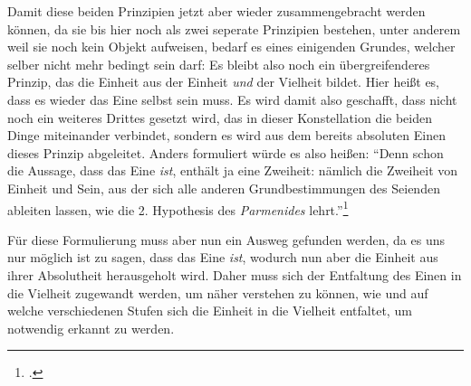 Damit diese beiden Prinzipien jetzt aber wieder zusammengebracht werden können, da sie bis hier noch als zwei seperate Prinzipien bestehen, unter anderem weil sie noch kein Objekt aufweisen, bedarf es eines einigenden Grundes, welcher selber nicht mehr bedingt sein darf:
Es bleibt also noch ein übergreifenderes Prinzip, das die Einheit aus der Einheit \emph{und} der Vielheit bildet. Hier heißt es, dass es wieder das Eine selbst sein muss. Es wird damit also geschafft, dass nicht noch ein weiteres Drittes gesetzt wird, das in dieser Konstellation die beiden Dinge miteinander verbindet, sondern es wird aus dem bereits absoluten Einen dieses Prinzip abgeleitet. 
Anders formuliert würde es also heißen:
\enquote{Denn schon die Aussage, dass das Eine \emph{ist}, enthält ja eine Zweiheit: nämlich die Zweiheit von Einheit und Sein, aus der sich alle anderen Grundbestimmungen des Seienden ableiten lassen, wie die 2. Hypothesis des \emph{Parmenides} lehrt.}\footcite[][S. 136f.]{halfwassen2015spuren}

Für diese Formulierung muss aber nun ein Ausweg gefunden werden, da es uns nur möglich ist zu sagen, dass das Eine \emph{ist}, wodurch nun aber die Einheit aus ihrer Absolutheit herausgeholt wird. Daher muss sich der Entfaltung des Einen in die Vielheit zugewandt werden, um näher verstehen zu können, wie und auf welche verschiedenen Stufen sich die Einheit in die Vielheit entfaltet, um notwendig erkannt zu werden.

